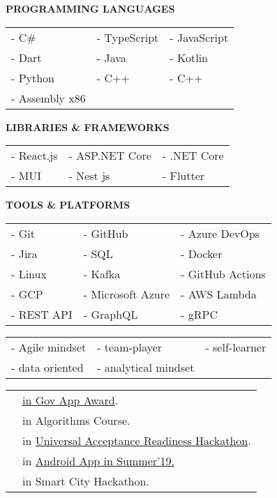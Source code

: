 \documentclass[10pt,a4paper,ragged2e]{altacv}
\begin{document}
\smallskip

\textcolor{VividPurple}{\textbf{PROGRAMMING LANGUAGES}}
\smallskip

\begin{tabular}{ l l l } 
	- C\#    & - TypeScript & - JavaScript \\
	- Dart   & - Java       & - Kotlin     \\
	- Python & - C++        & - C++        \\ 
	- Assembly x86                             \\ 
\end{tabular}
\smallskip

\textcolor{VividPurple}{\textbf{LIBRARIES \& FRAMEWORKS}}
\smallskip

\begin{tabular}{ l l l } 
	- React.js & - ASP.NET Core & - .NET Core \\
	- MUI      & - Nest js      & - Flutter   \\ 
\end{tabular}
\smallskip

\textcolor{VividPurple}{\textbf{TOOLS \& PLATFORMS}}
\smallskip

\begin{tabular}{ l l l }
	- Git      & - GitHub          & - Azure DevOps   \\
	- Jira     & - SQL             & - Docker         \\ 
	- Linux    & - Kafka           & - GitHub Actions \\
	- GCP      & - Microsoft Azure & - AWS Lambda     \\
	- REST API & - GraphQL         & - gRPC           \\
\end{tabular}
\smallskip

\smallskip
\begin{tabular}{ l l l } 
	- Agile mindset & - team-player & - self-learner \\
	- data oriented     & - analytical mindset                     \\
\end{tabular}

\smallskip

\begin{tabular}{ l l }
	\faTrophy &  \href{https://www.linkedin.com/feed/update/urn:li:activity:6711649526421295104/}{in Gov App Award}.         \\
	\faTrophy &  in Algorithms Course.              \\ 
	\faTrophy &  in \href{https://www.linkedin.com/feed/update/urn:li:activity:6572611476543025152/}{Universal Acceptance Readiness Hackathon}.  \\
	\faTrophy &  in \href{https://www.facebook.com/permalink.php?story_fbid=2077703849203331 & id=1839142163059502}{Android App in Summer’19.} \\
	\faTrophy &  in Smart City Hackathon.               \\
\end{tabular}
\end{document}
